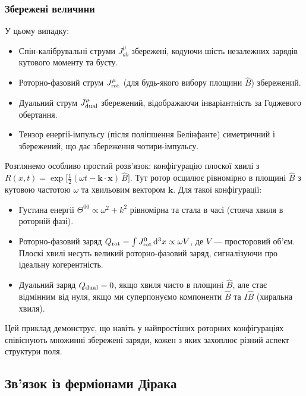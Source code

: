 \documentclass[11pt,a4paper]{article}
\numberwithin{equation}{section}
\theoremstyle{plain}
\theoremstyle{definition}
\theoremstyle{remark}
\newcommand{\dd}{\mathrm{d}}
\begin{document}
\subsubsection{Збережені величини}

У цьому випадку:

\begin{itemize}
  \item Спін-калібрувальні струми $J^\mu_{ab}$ збережені, кодуючи шість незалежних зарядів кутового моменту та бусту.
  \item Роторно-фазовий струм $J^\mu_{\rm rot}$ (для будь-якого вибору площини $\hat{B}$) збережений.
  \item Дуальний струм $J^\mu_{\rm dual}$ збережений, відображаючи інваріантність за Годжевого обертання.
  \item Тензор енергії-імпульсу (після поліпшення Белінфанте) симетричний і збережений, що дає збереження чотири-імпульсу.
\end{itemize}

Розглянемо особливо простий розв'язок: конфігурацію плоскої хвилі з $R(x,t) = \exp\big[\frac{1}{2}(\omega t - \mathbf{k}\cdot\mathbf{x})\,\hat{B}\big]$. Тут ротор осцилює рівномірно в площині $\hat{B}$ з кутовою частотою $\omega$ та хвильовим вектором $\mathbf{k}$. Для такої конфігурації:

\begin{itemize}
  \item Густина енергії $\Theta^{00} \propto \omega^2 + k^2$ рівномірна та стала в часі (стояча хвиля в роторній фазі).
  \item Роторно-фазовий заряд $Q_{\rm rot} = \int J^0_{\rm rot}\,\dd^3x \propto \omega V$, де $V$ — просторовий об'єм. Плоскі хвилі несуть великий роторно-фазовий заряд, сигналізуючи про ідеальну когерентність.
  \item Дуальний заряд $Q_{\rm dual} = 0$, якщо хвиля чисто в площині $\hat{B}$, але стає відмінним від нуля, якщо ми суперпонуємо компоненти $\hat{B}$ та $I\hat{B}$ (хиральна хвиля).
\end{itemize}

Цей приклад демонструє, що навіть у найпростіших роторних конфігураціях співіснують множинні збережені заряди, кожен з яких захоплює різний аспект структури поля.

\subsection{Зв'язок із ферміонами Дірака}
\end{document}
